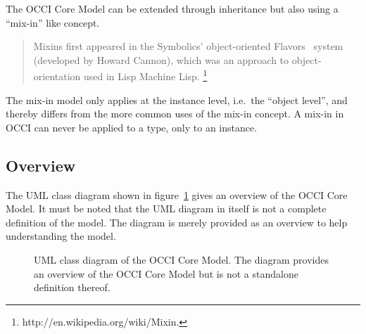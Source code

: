 \documentclass[10pt,a4paper]{article}
\begin{document}
The OCCI Core Model can be extended through inheritance but also
using a ``mix-in'' like concept.

\begin{quote}
  Mixins first appeared in the Symbolics' object-oriented
  Flavors~\cite{Moon:1986:flavors} system (developed by Howard
  Cannon), which was an approach to object-orientation used in Lisp
  Machine Lisp.%
  \footnote{http://en.wikipedia.org/wiki/Mixin.}
\end{quote}

The mix-in model only applies at the instance level, i.e.~the ``object
level'', and thereby differs from the more common uses of the mix-in
concept. A mix-in in OCCI can never be applied to a type, only to an
instance.

\subsection{Overview}

The UML class diagram shown in figure~\ref{fig:occi_model} gives an
overview of the OCCI Core Model. It must be noted that the UML diagram
in itself is not a complete definition of the model. The diagram is
merely provided as an overview to help understanding the model.

\begin{figure}[!h]
  {\centering {} \par}
  \caption{UML class diagram of the OCCI Core Model. The diagram
    provides an overview of the OCCI Core Model but is not a
    standalone definition thereof.}
  \label{fig:occi_model}
\end{figure}
\end{document}
